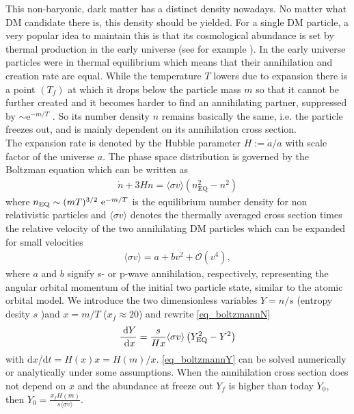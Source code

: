 This non-baryonic, dark matter has a distinct density nowadays. No matter what DM candidate there is, this density should be
yielded. For a single DM particle, a very popular idea to maintain this is that its cosmological abundance is set by thermal production in the 
early universe (see for example \cite{DM-EvCaDo}). In the early universe particles were in thermal equilibrium which means that their annihilation and creation rate are equal. 
While the temperature $T$ lowers due to expansion there is a point $(T_f)$ at which it drops below the particle mass $m$ so that it cannot be further created 
and it becomes harder to find an annihilating partner, suppressed by $\sim \text{e}^{-m/T}$ \cite{1603.03797}. So its number density $n$ 
remains basically the same, i.e. the particle freezes out, and is mainly dependent on its annihilation cross section.\\
The expansion rate is denoted by the Hubble parameter $H:=\dot{a}/a$ with scale factor of the universe $a$. The phase space distribution is 
governed by the Boltzman equation \cite{DM-EvCaDo} which can be written as 
\begin{align}
 \dot{n} + 3Hn = \langle \sigma v\rangle \left(n_\text{EQ}^2 - n^2\right)
 \label{eq_boltzmannN}
\end{align}
where $n_\text{EQ}\sim (mT)^{3/2}\ \text{e}^{-m/T}$ is the equilibrium number density for non relativistic particles and $\langle\sigma v\rangle$ denotes 
the thermally averaged cross section times the relative velocity of the two annihilating DM particles which can be expanded for small velocities
\begin{align}
 \langle \sigma v \rangle = a + bv^2 + \mathcal{O}(v^4),
\end{align}
where $a$ and $b$ signify s- or p-wave annihilation, respectively, representing the angular orbital momentum of the initial two particle state,
similar to the atomic orbital model. We introduce the two dimensionless variables $Y=n/s$ (entropy desity $s$ )and $x=m/T$ ($x_f\approx 20$) 
and rewrite \eqref{eq_boltzmannN}
\begin{align}
 \frac{\; \mathrm{d} Y}{\; \mathrm{d} x} = \frac{s}{Hx}\langle \sigma v\rangle \left(Y_\text{EQ}^2 - Y^2\right)
 \label{eq_boltzmannY}
\end{align}
with d$x$/d$t = H(x) x = H(m)/x$. \eqref{eq_boltzmannY} can be solved numerically or analytically under some assumptions. When the annihilation
cross section does not depend on $x$ and the abundance at freeze out $Y_f$ is higher than today $Y_0$, then $Y_0=\frac{x_fH(m)}{s \langle \sigma v\rangle}$.
